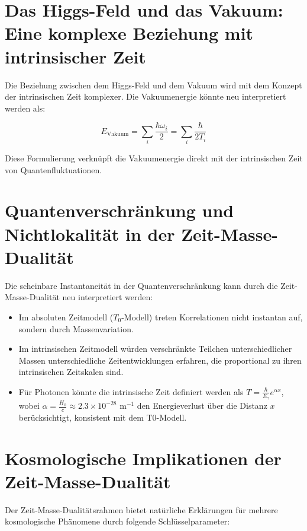 \documentclass{article}
\begin{document}
	\section{Das Higgs-Feld und das Vakuum: Eine komplexe Beziehung mit intrinsischer Zeit}
	
	Die Beziehung zwischen dem Higgs-Feld und dem Vakuum wird mit dem Konzept der intrinsischen Zeit komplexer. Die Vakuumenergie könnte neu interpretiert werden als:
	
	\begin{equation}
		E_\text{Vakuum} = \sum_i \frac{\hbar \omega_i}{2} = \sum_i \frac{\hbar}{2T_i}
	\end{equation}
	
	Diese Formulierung verknüpft die Vakuumenergie direkt mit der intrinsischen Zeit von Quantenfluktuationen.
	
	\section{Quantenverschränkung und Nichtlokalität in der Zeit-Masse-Dualität}
	
	Die scheinbare Instantaneität in der Quantenverschränkung kann durch die Zeit-Masse-Dualität neu interpretiert werden:
	
	\begin{itemize}
		\item Im absoluten Zeitmodell ($T_0$-Modell) treten Korrelationen nicht instantan auf, sondern durch Massenvariation.
		\item Im intrinsischen Zeitmodell würden verschränkte Teilchen unterschiedlicher Massen unterschiedliche Zeitentwicklungen erfahren, die proportional zu ihren intrinsischen Zeitskalen sind.
		\item Für Photonen könnte die intrinsische Zeit definiert werden als $T = \frac{\hbar}{E_{\gamma}} e^{\alpha x}$, wobei $\alpha = \frac{H_0}{c} \approx 2.3 \times 10^{-28} \text{ m}^{-1}$ den Energieverlust über die Distanz $x$ berücksichtigt, konsistent mit dem T0-Modell.
	\end{itemize}
	
	\section{Kosmologische Implikationen der Zeit-Masse-Dualität}
	
	Der Zeit-Masse-Dualitätsrahmen bietet natürliche Erklärungen für mehrere kosmologische Phänomene durch folgende Schlüsselparameter:
	
\end{document}
